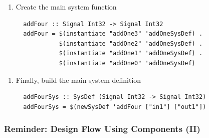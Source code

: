 \documentclass{beamer}
\begin{document}
\begin{frame}[fragile]
\begin{overprint}
   \begin{enumerate}[4)]
   \item Create the main system function
   \begin{lstlisting}
  addFour :: Signal Int32 -> Signal Int32
  addFour = $(instantiate "addOne3" 'addOneSysDef) .
            $(instantiate "addOne2" 'addOneSysDef) .
            $(instantiate "addOne1" 'addOneSysDef) .
            $(instantiate "addOne0" 'addOneSysDef)
   \end{lstlisting}
   \end{enumerate}

   \begin{enumerate}[5)]
   \item Finally, build the main system definition
   \begin{lstlisting}
  addFourSys :: SysDef (Signal Int32 -> Signal Int32)
  addFourSys = $(newSysDef 'addFour ["in1"] ["out1"])
   \end{lstlisting}
   \end{enumerate}

\end{overprint}

\end{frame}

\begin{frame}
  \frametitle{Reminder: Design Flow Using Components (II)}
\vspace{-0.2cm}
\begin{center}
\end{center}

\end{frame}
\end{document}
